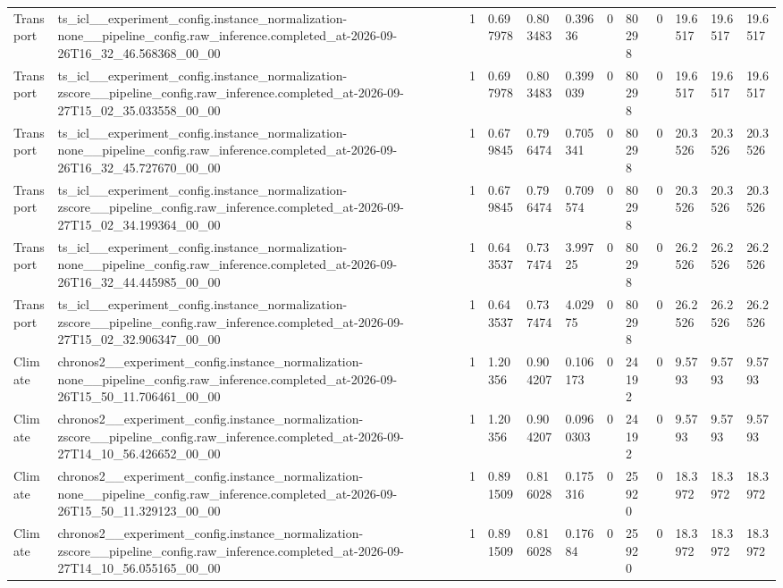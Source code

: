 \begin{tabular}{llllllllllll}
Transport & ts\_icl\_\_experiment\_config.instance\_normalization-none\_\_pipeline\_config.raw\_inference.completed\_at-2026-09-26T16\_32\_46.568368\_00\_00 & 1 & 0.697978 & 0.803483 & 0.39636 & 0 & 80298 & 0 & 19.6517 & 19.6517 & 19.6517 \\
Transport & ts\_icl\_\_experiment\_config.instance\_normalization-zscore\_\_pipeline\_config.raw\_inference.completed\_at-2026-09-27T15\_02\_35.033558\_00\_00 & 1 & 0.697978 & 0.803483 & 0.399039 & 0 & 80298 & 0 & 19.6517 & 19.6517 & 19.6517 \\
Transport & ts\_icl\_\_experiment\_config.instance\_normalization-none\_\_pipeline\_config.raw\_inference.completed\_at-2026-09-26T16\_32\_45.727670\_00\_00 & 1 & 0.679845 & 0.796474 & 0.705341 & 0 & 80298 & 0 & 20.3526 & 20.3526 & 20.3526 \\
Transport & ts\_icl\_\_experiment\_config.instance\_normalization-zscore\_\_pipeline\_config.raw\_inference.completed\_at-2026-09-27T15\_02\_34.199364\_00\_00 & 1 & 0.679845 & 0.796474 & 0.709574 & 0 & 80298 & 0 & 20.3526 & 20.3526 & 20.3526 \\
Transport & ts\_icl\_\_experiment\_config.instance\_normalization-none\_\_pipeline\_config.raw\_inference.completed\_at-2026-09-26T16\_32\_44.445985\_00\_00 & 1 & 0.643537 & 0.737474 & 3.99725 & 0 & 80298 & 0 & 26.2526 & 26.2526 & 26.2526 \\
Transport & ts\_icl\_\_experiment\_config.instance\_normalization-zscore\_\_pipeline\_config.raw\_inference.completed\_at-2026-09-27T15\_02\_32.906347\_00\_00 & 1 & 0.643537 & 0.737474 & 4.02975 & 0 & 80298 & 0 & 26.2526 & 26.2526 & 26.2526 \\
Climate & chronos2\_\_experiment\_config.instance\_normalization-none\_\_pipeline\_config.raw\_inference.completed\_at-2026-09-26T15\_50\_11.706461\_00\_00 & 1 & 1.20356 & 0.904207 & 0.106173 & 0 & 24192 & 0 & 9.5793 & 9.5793 & 9.5793 \\
Climate & chronos2\_\_experiment\_config.instance\_normalization-zscore\_\_pipeline\_config.raw\_inference.completed\_at-2026-09-27T14\_10\_56.426652\_00\_00 & 1 & 1.20356 & 0.904207 & 0.0960303 & 0 & 24192 & 0 & 9.5793 & 9.5793 & 9.5793 \\
Climate & chronos2\_\_experiment\_config.instance\_normalization-none\_\_pipeline\_config.raw\_inference.completed\_at-2026-09-26T15\_50\_11.329123\_00\_00 & 1 & 0.891509 & 0.816028 & 0.175316 & 0 & 25920 & 0 & 18.3972 & 18.3972 & 18.3972 \\
Climate & chronos2\_\_experiment\_config.instance\_normalization-zscore\_\_pipeline\_config.raw\_inference.completed\_at-2026-09-27T14\_10\_56.055165\_00\_00 & 1 & 0.891509 & 0.816028 & 0.17684 & 0 & 25920 & 0 & 18.3972 & 18.3972 & 18.3972 \\

\end{tabular}
